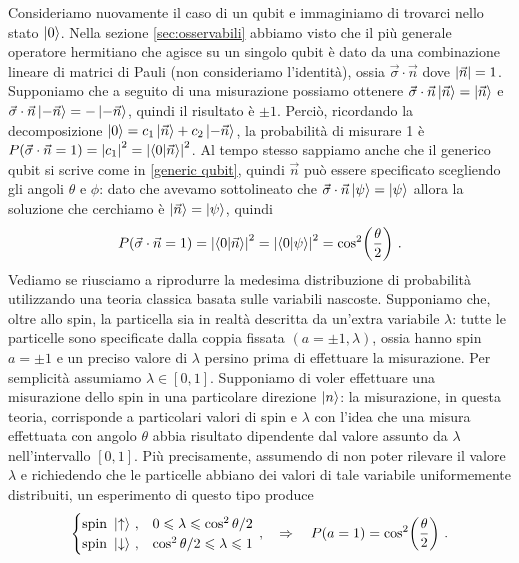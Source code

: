 \begin{esempio}
    Consideriamo nuovamente il caso di un qubit e immaginiamo di trovarci nello stato $\ket{0}$. Nella sezione \ref{sec:osservabili} abbiamo visto che il più generale operatore hermitiano che agisce su un singolo qubit è dato da una combinazione lineare di matrici di Pauli (non consideriamo l'identità), ossia $\vec{\sigma} \cdot \vec{n}$ dove $\abs{\vec{n}} = 1$. Supponiamo che a seguito di una misurazione possiamo ottenere $\vec{\sigma} \cdot \vec{n} \ket{\vec{n}} = \ket{\vec{n}}$ e $\vec{\sigma} \cdot \vec{n} \ket{-\vec{n}} = - \ket{-\vec{n}}$, quindi il risultato è $\pm 1$. Perciò, ricordando la decomposizione $\ket{0} = c_1 \ket{\vec{n}} + c_2 \ket{-\vec{n}}$, la probabilità di misurare 1 è $P(\vec{\sigma} \cdot \vec{n} = 1) = \abs{c_1}^2 = \abs{\braket{0}{\vec{n}}}^2$. Al tempo stesso sappiamo anche che il generico qubit si scrive come in \eqref{generic qubit}, quindi $\vec{n}$ può essere specificato scegliendo gli angoli $\theta$ e $\phi$: dato che avevamo sottolineato che $\vec{\sigma} \cdot \vec{n} \ket{\psi} = \ket{\psi}$ allora la soluzione che cerchiamo è $\ket{\vec{n}} = \ket{\psi}$, quindi
    \begin{equation*}
        P(\vec{\sigma} \cdot \vec{n} = 1) = \abs{\braket{0}{\vec{n}}}^2 = \abs{\braket{0}{\psi}}^2 = \cos^2 \! \left( \frac{\theta}{2} \right) \, .
    \end{equation*}
    Vediamo se riusciamo a riprodurre la medesima distribuzione di probabilità utilizzando una teoria classica basata sulle variabili nascoste. Supponiamo che, oltre allo spin, la particella sia in realtà descritta da un'extra variabile $\lambda$: tutte le particelle sono specificate dalla coppia fissata $(a = \pm 1, \lambda)$, ossia hanno spin $a = \pm 1$ e un preciso valore di $\lambda$ persino prima di effettuare la misurazione. Per semplicità assumiamo $\lambda \in [0,1]$. Supponiamo di voler effettuare una misurazione dello spin in una particolare direzione $\ket{n}$: la misurazione, in questa teoria, corrisponde a particolari valori di spin e $\lambda$ con l'idea che una misura effettuata con angolo $\theta$ abbia risultato dipendente dal valore assunto da $\lambda$ nell'intervallo $[0,1]$. Più precisamente, assumendo di non poter rilevare il valore $\lambda$ e richiedendo che le particelle abbiano dei valori di tale variabile uniformemente distribuiti, un esperimento di questo tipo produce
    \begin{equation*}
        \begin{cases}
            \text{spin }\ket{\uparrow} \, , &0 \leqslant \lambda \leqslant \cos^2 \theta/2 \\
            \text{spin }\ket{\downarrow} \, , &\cos^2 \theta/2 \leqslant \lambda \leqslant 1
        \end{cases} \, , \quad \Rightarrow \quad P(a = 1) = \cos^2 \! \left( \frac{\theta}{2} \right) \, .
    \end{equation*}
\end{esempio}

